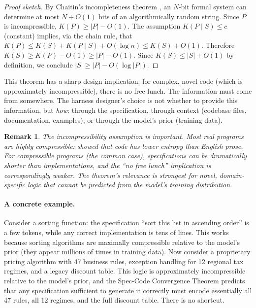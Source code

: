\documentclass[11pt, a4paper]{googledeepmind}
\newtheorem*{remark}{Remark}
\begin{document}
\begin{proof}[Proof sketch]
By Chaitin's incompleteness theorem \citep{chaitin1966length}, an $N$-bit formal system can determine at most $N + O(1)$ bits of an algorithmically random string. Since $P$ is incompressible, $K(P) \geq |P| - O(1)$. The assumption $K(P \mid S) \leq c$ (constant) implies, via the chain rule, that $K(P) \leq K(S) + K(P \mid S) + O(\log n) \leq K(S) + O(1)$. Therefore $K(S) \geq K(P) - O(1) \geq |P| - O(1)$. Since $K(S) \leq |S| + O(1)$ by definition, we conclude $|S| \geq |P| - O(\log |P|)$.
\end{proof}

This theorem has a sharp design implication: for complex, novel code (which is approximately incompressible), there is no free lunch. The information must come from somewhere. The harness designer's choice is not whether to provide this information, but \emph{how}: through the specification, through context (codebase files, documentation, examples), or through the model's prior (training data).

\begin{remark}
The incompressibility assumption is important. Most real programs are highly compressible: \citet{hindle2012naturalness} showed that code has lower entropy than English prose. For compressible programs (the common case), specifications can be dramatically shorter than implementations, and the ``no free lunch'' implication is correspondingly weaker. The theorem's relevance is strongest for novel, domain-specific logic that cannot be predicted from the model's training distribution.
\end{remark}

\paragraph{A concrete example.} Consider a sorting function: the specification ``sort this list in ascending order'' is a few tokens, while any correct implementation is tens of lines. This works because sorting algorithms are maximally compressible relative to the model's prior (they appear millions of times in training data). Now consider a proprietary pricing algorithm with 47 business rules, exception handling for 12 regional tax regimes, and a legacy discount table. This logic is approximately incompressible relative to the model's prior, and the Spec-Code Convergence Theorem predicts that any specification sufficient to generate it correctly must encode essentially all 47 rules, all 12 regimes, and the full discount table. There is no shortcut.
\end{document}
